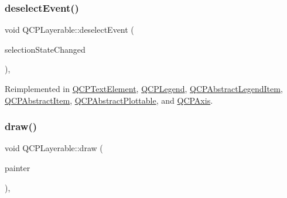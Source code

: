\subsubsection{\texorpdfstring{deselect\+Event()}{deselectEvent()}}
{\footnotesize\ttfamily void Q\+C\+P\+Layerable\+::deselect\+Event (\begin{DoxyParamCaption}\item[{bool $\ast$}]{selection\+State\+Changed }\end{DoxyParamCaption})\hspace{0.3cm}{\ttfamily [protected]}, {\ttfamily [virtual]}}



Reimplemented in \hyperlink{class_q_c_p_text_element_a9a631a9deb9d82089a9d52de1744accf}{Q\+C\+P\+Text\+Element}, \hyperlink{class_q_c_p_legend_ac2066837f7ebc32a5b15434cdca5b176}{Q\+C\+P\+Legend}, \hyperlink{class_q_c_p_abstract_legend_item_aa1c0620558cc8e2a2e6fb7ab558f6097}{Q\+C\+P\+Abstract\+Legend\+Item}, \hyperlink{class_q_c_p_abstract_item_af9093798cb07a861dcc73f93ca16c0c1}{Q\+C\+P\+Abstract\+Item}, \hyperlink{class_q_c_p_abstract_plottable_a9b104d9da4f38f934363945c313bf82e}{Q\+C\+P\+Abstract\+Plottable}, and \hyperlink{class_q_c_p_axis_a5bc1f8a8d0fbc7658eba70c80279ed31}{Q\+C\+P\+Axis}.

\mbox{\label{class_q_c_p_layerable_aecf2f7087482d4b6a78cb2770e5ed12d}} 
\subsubsection{\texorpdfstring{draw()}{draw()}}
{\footnotesize\ttfamily void Q\+C\+P\+Layerable\+::draw (\begin{DoxyParamCaption}\item[{\hyperlink{class_q_c_p_painter}{Q\+C\+P\+Painter} $\ast$}]{painter }\end{DoxyParamCaption})\hspace{0.3cm}{\ttfamily [protected]}, {}}



